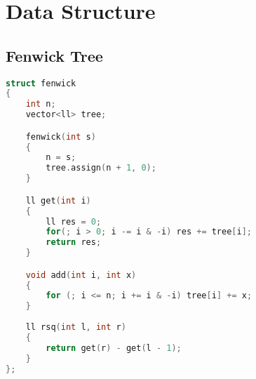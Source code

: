 \chapter{Data Structure}

\section{Fenwick Tree}
\begin{lstlisting}[language=C++]
struct fenwick
{
    int n;
    vector<ll> tree;

    fenwick(int s)
    {
        n = s;
        tree.assign(n + 1, 0);
    }

    ll get(int i)
    {
        ll res = 0;
        for(; i > 0; i -= i & -i) res += tree[i];
        return res;
    }

    void add(int i, int x)
    {
        for (; i <= n; i += i & -i) tree[i] += x;
    }
    
    ll rsq(int l, int r)
    {
        return get(r) - get(l - 1);
    }
};
\end{lstlisting}
\sectionend

